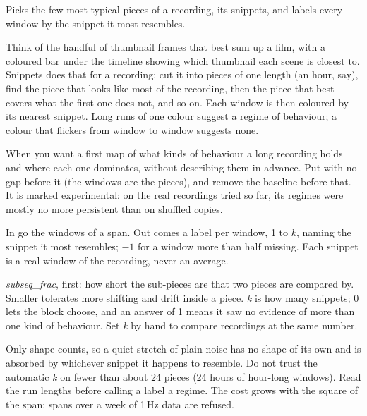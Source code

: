 Picks the few most typical pieces of a recording, its snippets, and labels every window by the
snippet it most resembles.

\begin{plainterms}[Snippets]
Think of the handful of thumbnail frames that best sum up a film, with a coloured bar under the
timeline showing which thumbnail each scene is closest to. Snippets does that for a recording: cut
it into pieces of one length (an hour, say), find the piece that looks like most of the recording,
then the piece that best covers what the first one does not, and so on. Each window is then
coloured by its nearest snippet. Long runs of one colour suggest a regime of behaviour; a colour
that flickers from window to window suggests none.
\end{plainterms}

When you want a first map of what kinds of behaviour a long recording holds and where each one
dominates, without describing them in advance. Put  with no
gap before it (the windows are the pieces), and remove the baseline before that. It is marked
experimental: on the real recordings tried so far, its regimes were mostly no more persistent than
on shuffled copies.

In go the windows of a span. Out comes a label per window, 1 to $k$, naming the snippet it most
resembles; $-1$ for a window more than half missing. Each snippet is a real window of the recording,
never an average.

\emph{subseq\_frac}, first: how short the sub-pieces are that two pieces are compared by. Smaller
tolerates more shifting and drift inside a piece. \emph{k} is how many snippets; 0 lets the block
choose, and an answer of 1 means it saw no evidence of more than one kind of behaviour. Set \emph{k}
by hand to compare recordings at the same number.

Only shape counts, so a quiet stretch of plain noise has no shape of its own and is absorbed by
whichever snippet it happens to resemble. Do not trust the automatic \emph{k} on fewer than about 24
pieces (24 hours of hour-long windows). Read the run lengths before calling a label a regime. The
cost grows with the square of the span; spans over a week of 1\,Hz data are refused.
